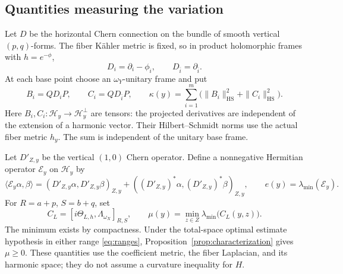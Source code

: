 \documentclass[11pt,reqno]{amsart}
\numberwithin{equation}{section}
\theoremstyle{definition}
\theoremstyle{remark}
\newcommand{\ip}[2]{\langle #1,#2\rangle}
\begin{document}
\subsection{Quantities measuring the variation}
Let $D$ be the horizontal Chern connection on the bundle of smooth vertical $(p,q)$-forms. The fiber K\"ahler metric is fixed, so in product holomorphic frames with $h=e^{-\phi}$,
\[
 D_i=\partial_i-\phi_i,\qquad D_{\bar i}=\partial_{\bar i}.
\]
At each base point choose an $\omega_Y$-unitary frame and put
\begin{equation}\label{eq:product-variation-tensors}
 B_i=QD_iP,\qquad C_i=QD_{\bar i}P,\qquad
 \kappa(y)=\sum_{i=1}^m
     \bigl(\|B_i\|_{\mathrm{HS}}^2+\|C_i\|_{\mathrm{HS}}^2\bigr).
\end{equation}
Here $B_i,C_i:\mathcal H_y\to\mathcal H_y^\perp$ are tensors: the projected derivatives are independent of the extension of a harmonic vector. Their Hilbert--Schmidt norms use the actual fiber metric $h_y$. The sum is independent of the unitary base frame.

Let $D'_{Z,y}$ be the vertical $(1,0)$ Chern operator. Define a nonnegative Hermitian operator $\mathcal E_y$ on $\mathcal H_y$ by
\begin{equation}\label{eq:fiber-energy-operator}
 \ip{\mathcal E_y\alpha}{\beta}
   =(D'_{Z,y}\alpha,D'_{Z,y}\beta)_{Z,y}
       +((D'_{Z,y})^*\alpha,(D'_{Z,y})^*\beta)_{Z,y},
 \qquad e(y)=\lambda_{\min}(\mathcal E_y).
\end{equation}
For $R=a+p$, $S=b+q$, set
\begin{equation}\label{eq:total-margin}
 C_L=[i\Theta_{L,h},\Lambda_{\omega_X}]_{R,S},
 \qquad
 \mu(y)=\min_{z\in Z}\lambda_{\min}\bigl(C_L(y,z)\bigr).
\end{equation}
The minimum exists by compactness. Under the total-space optimal estimate hypothesis in either range \eqref{eq:ranges}, Proposition~\ref{prop:characterization} gives $\mu\geq0$. These quantities use the coefficient metric, the fiber Laplacian, and its harmonic space; they do not assume a curvature inequality for $H$.
\end{document}
